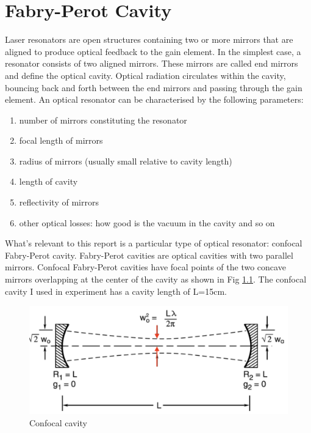 \documentclass[12pt]{report}
\begin{document}
\chapter{Fabry-Perot Cavity}
Laser resonators are open structures containing two or more mirrors that are aligned to produce optical feedback to the gain element. In the simplest case, a resonator consists of two aligned mirrors. These mirrors are called end mirrors and define the optical cavity. Optical radiation circulates within the cavity, bouncing back and forth between the end mirrors and passing through the gain element. An optical resonator can be characterised by the following parameters: 
\begin{enumerate}
    \item number of mirrors constituting the resonator
    \item focal length of mirrors
    \item radius of mirrors (usually small relative to cavity length)
    \item length of cavity
    \item reflectivity of mirrors
    \item other optical losses: how good is the vacuum in the cavity and so on
\end{enumerate}
What's relevant to this report is a particular type of optical resonator: confocal Fabry-Perot cavity. Fabry-Perot cavities are optical cavities with two parallel mirrors. Confocal Fabry-Perot cavities have focal points of the two concave mirrors overlapping at the center of the cavity as shown in Fig \ref{fig:confocalCavity}. The confocal cavity I used in experiment has a cavity length of L=15cm. 

\begin{figure}[H]
    \centering
    \includegraphics[width = .8\textwidth]{confocalCavity.png}
    \caption{Confocal cavity}
    \label{fig:confocalCavity}
\end{figure}
\end{document}

